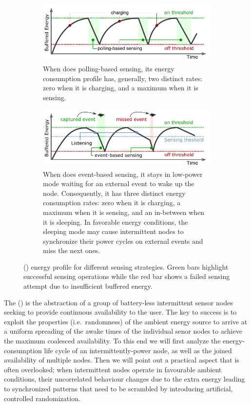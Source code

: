 \begin{figure}[t]
	\centering
		\begin{subfigure}{\columnwidth}
			\includegraphics[width=\columnwidth]{figures/PowerCycleIntermittentSystem}
			\caption{When \sys does polling-based sensing, its energy consumption profile has, generally, two distinct rates: zero when it is charging, and a maximum when it is sensing.}
			\label{fig:pollingBasedSensing}
	\end{subfigure}
	\begin{subfigure}{\columnwidth}
		\includegraphics[width=\columnwidth]{figures/PowerCycleIntermittentSensor}
		\caption{When \sys does event-based sensing, it stays in low-power mode waiting for an external event to wake up the node. Consequently,  it has three distinct energy consumption rates: zero when it is charging, a maximum when it is sensing, and an in-between when it is sleeping. In favorable energy conditions, the sleeping mode may cause intermittent nodes to synchronize their power cycles on external events and miss the next ones.}
		\label{fig:eventBasedSensing}
\end{subfigure}
		\caption{\fullsys (\sys) energy profile for different sensing strategies. Green bars highlight successful sensing operations  while the red bar shows a failed sensing attempt due to insufficient buffered energy.}
		\label{fig:cisPwrCycle}
\end{figure} 
%
The \fullsys (\sys) is the abstraction of a group of battery-less intermittent sensor nodes seeking to provide continuous availability to the user. The key to success is to exploit the properties (i.e.\ randomness) of the ambient energy source to arrive at a uniform spreading of the awake times of the individual senor nodes to achieve the maximum coalesced availability. To this end we will first analyze the energy-consumption life cycle of an intermittently-power node, as well as the joined availability of multiple nodes. Then we will point out a practical aspect that is often overlooked; when intermittent nodes operate in favourable ambient conditions, their uncorrelated behaviour changes due to the extra energy leading to synchronized patterns that need to be scrambled by introducing artificial, controlled randomization.


